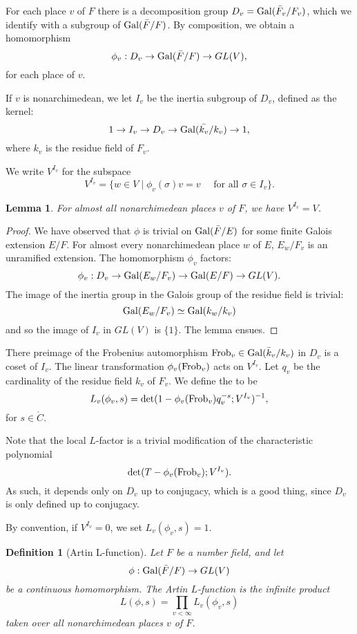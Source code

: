 \documentclass{amsart}
\newtheorem{definition}[equation]{Definition}
\newtheorem{lemma}[equation]{Lemma}
\begin{document}
For each place $v$ of $F$ there is a decomposition group
$D_v={\operatorname{Gal}}(\bar F_v/F_v)$, which we identify with a subgroup of
${\operatorname{Gal}}(\bar F/F)$.  By composition, we obtain a homomorphism
\[
\phi_v:D_v \to {\operatorname{Gal}}(\bar F/F)\to GL(V),
\]
for each place of $v$.   

If $v$ is nonarchimedean, we let $I_v$ be
the inertia subgroup of $D_v$, defined as the kernel:
\[
1 \to I_v \to D_v \to {\operatorname{Gal}}(\bar {k_v}/k_v)\to 1,
\]
where $k_v$ is the residue field of $F_v$.

We write $V^{I_v}$ for the subspace
\[
V^{I_v} = \{w\in V\mid \phi_v(\sigma)v = v \quad\text{ for all } \sigma\in I_v\}.
\]

\begin{lemma}
For almost all nonarchimedean places $v$ of $F$, we have $V^{I_v} = V$.
\end{lemma}

\begin{proof}
We have observed that $\phi$ is trivial on ${\operatorname{Gal}}(\bar{F}/E)$ for some finite
Galois extension $E/F$.  For almost every nonarchimedean place $w$ of $E$,
$E_w/F_v$ is an unramified extension.  The homomorphism $\phi_v$ factors:
\[
\phi_v:D_v\to {\operatorname{Gal}}(E_w/F_v)\to {\operatorname{Gal}}(E/F)\to GL(V).
\]
The image of the inertia group in the Galois group of the residue field is trivial:
\[
{\operatorname{Gal}}(E_w/F_v)\simeq {\operatorname{Gal}}(k_w/k_v)
\]
and so the image of $I_v$ in $GL(V)$ is $\{1\}$.  The lemma ensues.
\end{proof}

There preimage of the Frobenius automorphism ${\operatorname{Frob}}_v\in{\operatorname{Gal}}(\bar{k}_v/k_v)$ 
in $D_v$ is
a coset of $I_v$.  The linear transformation $\phi_v({\operatorname{Frob}}_v)$ acts
on $V^{I_v}$.
Let $q_v$ be the cardinality of the residue field $k_v$ of $F_v$.
We define the  to be
\[
L_v(\phi_v,s) = {\operatorname{det}}(1- \phi_v({\operatorname{Frob}}_v) q_v^{-s}; V^{I_v})^{-1},
\]
for $s\in \ring{C}$.

Note that the local $L$-factor is a trivial modification of the characteristic polynomial
\[
{\operatorname{det}}(T - \phi_v({\operatorname{Frob}}_v); V^{I_v}).
\]
As such, it depends only on  $D_v$ up to conjugacy, which is a good thing, since
$D_v$ is only defined up to conjugacy.

By convention, if $V^{I_v}=0$, we set $L_v(\phi_v,s)=1$.

\begin{definition}[Artin L-function]  Let $F$ be a number field, and let
\[
\phi:{\operatorname{Gal}}(\bar{F}/F)\to GL(V)
\]
be a continuous homomorphism.
The Artin $L$-function is the infinite product
\[
L(\phi,s) = \prod_{v<\infty} L_v(\phi_v,s)
\]
taken over all nonarchimedean places $v$ of $F$.
\end{definition}
\end{document}
